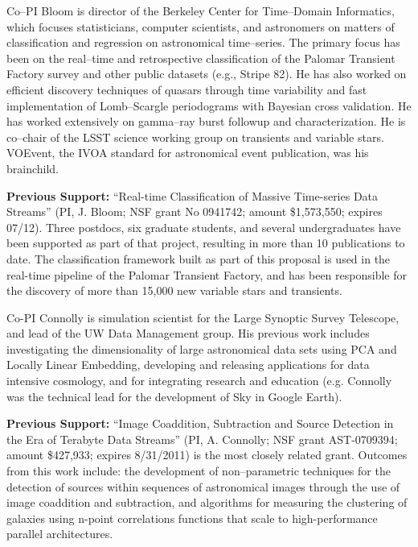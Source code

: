  \smallskip

Co--PI Bloom is director of the Berkeley Center for Time--Domain Informatics,
which focuses statisticians, computer scientists, and astronomers on matters of
classification and regression on astronomical time--series.  The primary focus
has been on the real--time and retrospective classification of the Palomar
Transient Factory survey and other public datasets (e.g., Stripe 82). He has
also worked on efficient discovery techniques of quasars through time
variability and fast implementation of Lomb--Scargle periodograms with Bayesian
cross validation. He has worked extensively on gamma--ray burst followup and
characterization. He is co--chair of the LSST science working group on
transients and variable stars. VOEvent, the IVOA standard for astronomical event
publication, was his brainchild.

{\bf Previous Support:} ``Real-time Classification of Massive Time-series Data
Streams'' (PI, J. Bloom; NSF grant No 0941742; amount \$1,573,550; expires
07/12).  Three postdocs, six graduate students, and several undergraduates have
been supported as part of that project, resulting in more than 10 publications
to date.  The classification framework built as part of this proposal is used in
the real-time pipeline of the Palomar Transient Factory, and has been
responsible for the discovery of more than 15,000 new variable stars and
transients.

 \smallskip

Co-PI Connolly is simulation scientist for the Large Synoptic Survey Telescope,
and lead of the UW Data Management group.  His previous work includes
investigating the dimensionality of large astronomical data sets using PCA and
Locally Linear Embedding, developing and releasing applications for data
intensive cosmology, and for integrating research and education (e.g. Connolly
was the technical lead for the development of Sky in Google Earth).

{\bf Previous Support:} ``Image Coaddition, Subtraction and Source Detection in
the Era of Terabyte Data Streams'' (PI, A. Connolly; NSF grant AST-0709394;
amount \$427,933; expires 8/31/2011) is the most closely related grant. Outcomes
from this work include: the development of non--parametric techniques for the
detection of sources within sequences of astronomical images through the use of
image coaddition and subtraction, and algorithms for measuring the clustering of
galaxies using n-point correlations functions that scale to high-performance
parallel architectures.


